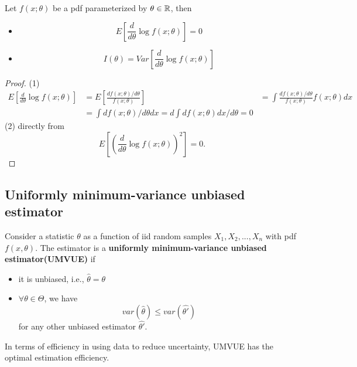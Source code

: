 \begin{refsection}
\begin{lemma} \label{ch:theory-of-statistics:th:usefulresult}
	 Let $f(x;\theta)$ be a pdf parameterized by $\theta\in \mathbb{R}$, then 
\begin{itemize}
    \item $$E[\frac{d}{d\theta} \log f(x;\theta)] = 0$$
    \item $$I(\theta) = Var[\frac{d}{d\theta} \log f(x;\theta)]$$   
\end{itemize}
\end{lemma}
\begin{proof}
(1) 
\begin{align*}
E[\frac{d}{d\theta} \log f(x;\theta)] &= E[\frac{df(x;\theta)/d\theta}{f(x;\theta)}] &= \int \frac{df(x;\theta)/d\theta}{f(x;\theta)} f(x;\theta) dx\\
&=\int df(x;\theta)/d\theta dx =d\int df(x;\theta) dx /d\theta = 0
\end{align*}
(2) directly from $$E[(\frac{d}{d\theta} \log f(x;\theta))^2] = 0.$$
\end{proof}




\subsection{Uniformly minimum-variance unbiased estimator}
\begin{definition}
Consider a statistic $\theta$ as a function of iid random samples $X_1,X_2,...,X_n$ with pdf $f(x,\theta)$. The estimator is a \textbf{uniformly minimum-variance unbiased estimator(UMVUE)} if 
\begin{itemize}
    \item it is unbiased, i.e., $\hat{\theta} = \theta$
    \item $\forall \theta \in \Theta$, we have $$var(\hat{\theta}) \leq var(\hat{\theta'})$$ for any other unbiased estimator $\hat{\theta'}$.
\end{itemize}
\end{definition}

\begin{remark} [interpretation]
In terms of efficiency in using data to reduce uncertainty, UMVUE has the optimal estimation efficiency.
\end{remark}





\begin{theorem}\cite[62]{keener2010theoretical}



\end{theorem}
\end{refsection}
